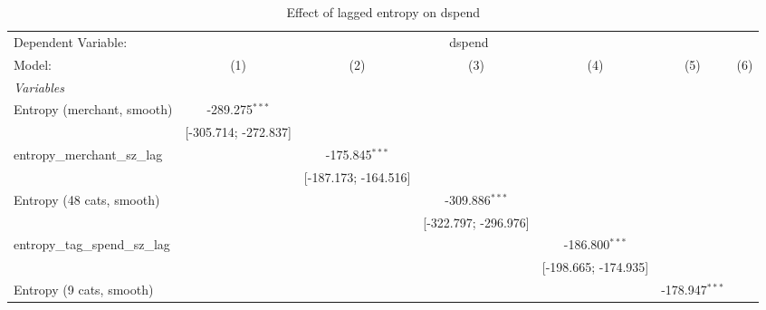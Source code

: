 
\begin{table}[htbp]
   \centering
   \tiny
   \begin{threeparttable}[b]
      \caption{\label{tab:reg_dspend_lagged_sz} Effect of lagged entropy on dspend}
      \begin{tabular}{lcccccc}
         \tabularnewline \midrule \midrule
         Dependent Variable: & \multicolumn{6}{c}{dspend}\\
         Model:                           & (1)                  & (2)                  & (3)                  & (4)                  & (5)                  & (6)\\  
         \midrule
         \emph{Variables}\\
         Entropy (merchant, smooth)       & -289.275$^{***}$     &                      &                      &                      &                      &   \\   
                                          & [-305.714; -272.837] &                      &                      &                      &                      &   \\   
         entropy\_merchant\_sz\_lag       &                      & -175.845$^{***}$     &                      &                      &                      &   \\   
                                          &                      & [-187.173; -164.516] &                      &                      &                      &   \\   
         Entropy (48 cats, smooth)        &                      &                      & -309.886$^{***}$     &                      &                      &   \\   
                                          &                      &                      & [-322.797; -296.976] &                      &                      &   \\   
         entropy\_tag\_spend\_sz\_lag     &                      &                      &                      & -186.800$^{***}$     &                      &   \\   
                                          &                      &                      &                      & [-198.665; -174.935] &                      &   \\   
         Entropy (9 cats, smooth)         &                      &                      &                      &                      & -178.947$^{***}$     &   \\   

\end{tabular}
\end{threeparttable}
\end{table}
